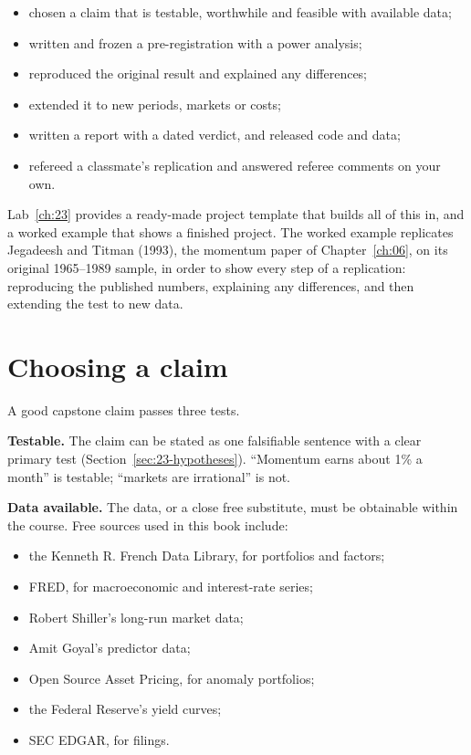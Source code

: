 \begin{itemize}
  \item chosen a claim that is testable, worthwhile and feasible with available data;
  \item written and frozen a pre-registration with a power analysis;
  \item reproduced the original result and explained any differences;
  \item extended it to new periods, markets or costs;
  \item written a report with a dated verdict, and released code and data;
  \item refereed a classmate's replication and answered referee comments on your own.
\end{itemize}

Lab~\ref{ch:23} provides a ready-made project template that builds all of this in, and a worked example that shows a finished project. The worked example replicates Jegadeesh and Titman (1993), the momentum paper of Chapter~\ref{ch:06}, on its original 1965--1989 sample, in order to show every step of a replication: reproducing the published numbers, explaining any differences, and then extending the test to new data.

\section{Choosing a claim}
\label{sec:23-choosing}

A good capstone claim passes three tests.

\textbf{Testable.} The claim can be stated as one falsifiable sentence with a clear primary test (Section~\ref{sec:23-hypotheses}). ``Momentum earns about 1\% a month'' is testable; ``markets are irrational'' is not.

\textbf{Data available.} The data, or a close free substitute, must be obtainable within the course. Free sources used in this book include:

\begin{itemize}
  \item the Kenneth R. French Data Library, for portfolios and factors;
  \item FRED, for macroeconomic and interest-rate series;
  \item Robert Shiller's long-run market data;
  \item Amit Goyal's predictor data;
  \item Open Source Asset Pricing, for anomaly portfolios;
  \item the Federal Reserve's yield curves;
  \item SEC EDGAR, for filings.
\end{itemize}

